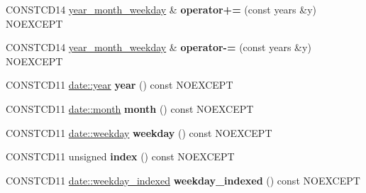 \begin{DoxyCompactItemize}
\item 
\mbox{\label{classdate_1_1year__month__weekday_aac36851e78a68f59f881149fcf8f6b92}} 
C\+O\+N\+S\+T\+C\+D14 \mbox{\hyperlink{classdate_1_1year__month__weekday}{year\+\_\+month\+\_\+weekday}} \& {\bfseries operator+=} (const years \&y) N\+O\+E\+X\+C\+E\+PT
\item 
\mbox{\label{classdate_1_1year__month__weekday_a5c015698238c7c26475d0e667b7e5a20}} 
C\+O\+N\+S\+T\+C\+D14 \mbox{\hyperlink{classdate_1_1year__month__weekday}{year\+\_\+month\+\_\+weekday}} \& {\bfseries operator-\/=} (const years \&y) N\+O\+E\+X\+C\+E\+PT
\item 
\mbox{\label{classdate_1_1year__month__weekday_a655f8509dcdeb1d9fdc5baed73522d45}} 
C\+O\+N\+S\+T\+C\+D11 \mbox{\hyperlink{classdate_1_1year}{date\+::year}} {\bfseries year} () const N\+O\+E\+X\+C\+E\+PT
\item 
\mbox{\label{classdate_1_1year__month__weekday_aa7611eb26172e286d894da06af3a14f6}} 
C\+O\+N\+S\+T\+C\+D11 \mbox{\hyperlink{classdate_1_1month}{date\+::month}} {\bfseries month} () const N\+O\+E\+X\+C\+E\+PT
\item 
\mbox{\label{classdate_1_1year__month__weekday_ac96dc8514676005aebd92ca99adcc45a}} 
C\+O\+N\+S\+T\+C\+D11 \mbox{\hyperlink{classdate_1_1weekday}{date\+::weekday}} {\bfseries weekday} () const N\+O\+E\+X\+C\+E\+PT
\item 
\mbox{\label{classdate_1_1year__month__weekday_a111b0830ad3d6d90a978779974138a0d}} 
C\+O\+N\+S\+T\+C\+D11 unsigned {\bfseries index} () const N\+O\+E\+X\+C\+E\+PT
\item 
\mbox{\label{classdate_1_1year__month__weekday_a4ea4a1f5e8323f5bda1538e664dc7d5d}} 
C\+O\+N\+S\+T\+C\+D11 \mbox{\hyperlink{classdate_1_1weekday__indexed}{date\+::weekday\+\_\+indexed}} {\bfseries weekday\+\_\+indexed} () const N\+O\+E\+X\+C\+E\+PT
\item 
\mbox{\label{classdate_1_1year__month__weekday_ae5552a8f01baef8f7d45e353bfc9b762}} 

\end{DoxyCompactItemize}
